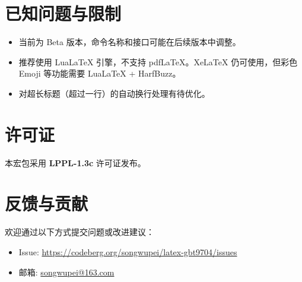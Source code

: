\documentclass[redline, titleindent, zhlineskip]{gbt9704}
\begin{document}
\section{已知问题与限制}
\begin{itemize}
  \item 当前为 Beta 版本，命令名称和接口可能在后续版本中调整。
  \item 推荐使用 LuaLaTeX 引擎，不支持 pdfLaTeX。XeLaTeX 仍可使用，但彩色 Emoji 等功能需要 LuaLaTeX + HarfBuzz。
  \item 对超长标题（超过一行）的自动换行处理有待优化。
\end{itemize}

\section{许可证}
本宏包采用 \textbf{LPPL-1.3c} 许可证发布。

\section{反馈与贡献}
欢迎通过以下方式提交问题或改进建议：
\begin{itemize}
  \item Issue: \url{https://codeberg.org/songwupei/latex-gbt9704/issues}
  \item 邮箱: \url{songwupei@163.com}
\end{itemize}
\end{document}
